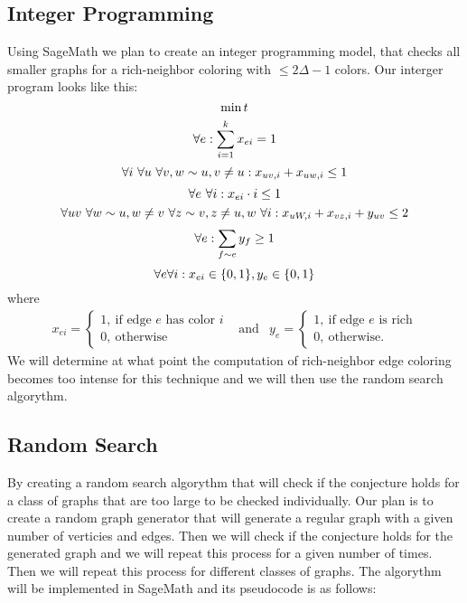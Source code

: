 \documentclass[12pt,a4paper]{amsart}
\theoremstyle{definition} %
\theoremstyle{plain} %
\begin{document}
\subsection{Integer Programming}
    Using SageMath we plan to create an integer programming model, that checks all smaller graphs for a rich-neighbor coloring with $\leq2\Delta - 1$ colors. Our interger program looks like this:
    $$
    \min t \\
    $$
    $$
    \forall e: \sum_{i=1}^{k} x_{ei} = 1 \\
    $$
    $$\forall i \ \forall u \ \forall v, w \sim u, v \neq u: x_{uv, i} + x_{uw, i} \leq 1 \\$$
    $$\forall e \ \forall i: x_{ei} \cdot i \leq 1 \\$$
    $$\forall uv \ \forall w \sim u, w \neq v \ \forall z \sim v, z \neq u, w \ \forall i: x_{uW, i} + x_{vz, i} + y_{uv} \leq 2 \\$$
    $$\forall e: \sum_{f \sim e}y_f \geq 1 \\$$
    $$
    \forall e \forall i: x_{ei} \in \{0, 1\}, y_{e} \in \{0, 1\} \\
    $$
    where
    \begin{align*}        x_{ei} = \begin{cases}
                1, \  \text{if edge $e$ has color $i$} \\
                0, \  \text{otherwise}
        \end{cases} & \text{and} &
            y_{e} = \begin{cases}
                1, \  \text{if edge $e$ is rich} \\
                0, \  \text{otherwise.}
            \end{cases}
    \end{align*}
     We will determine at what point the computation of rich-neighbor edge coloring becomes too intense for this technique and we will then use the random search algorythm.

     \subsection{Random Search}
        By creating a random search algorythm that will check if the conjecture holds for a class of graphs that are too large to be checked individually. Our plan is to create a random graph generator that will generate a regular graph with a given number of verticies and edges. Then we will check if the conjecture holds for the generated graph and we will repeat this process for a given number of times. Then we will repeat this process for different classes of graphs. The algorythm will be implemented in SageMath and its pseudocode is as follows:
\end{document}
